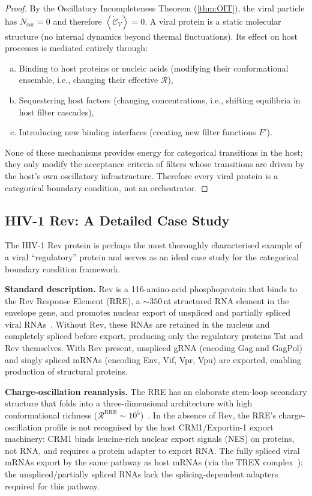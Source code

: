 \documentclass[11pt,twocolumn,a4paper]{article}
\theoremstyle{definition}
\theoremstyle{remark}
\newcommand{\Nosc}{N_{\mathrm{osc}}}
\newcommand{\Rcat}{\mathcal{R}}
\newcommand{\avg}[1]{\left\langle #1 \right\rangle}
\begin{document}
\begin{proof}
By the Oscillatory Incompleteness Theorem (\cref{thm:OIT}), the viral particle has $\Nosc = 0$ and therefore $\avg{\dot{\mathcal{C}}_V} = 0$. A viral protein is a static molecular structure (no internal dynamics beyond thermal fluctuations). Its effect on host processes is mediated entirely through:
\begin{enumerate}[(a)]
  \item Binding to host proteins or nucleic acids (modifying their conformational ensemble, i.e., changing their effective $\Rcat$),
  \item Sequestering host factors (changing concentrations, i.e., shifting equilibria in host filter cascades),
  \item Introducing new binding interfaces (creating new filter functions $F'$).
\end{enumerate}
None of these mechanisms provides energy for categorical transitions in the host; they only modify the acceptance criteria of filters whose transitions are driven by the host's own oscillatory infrastructure. Therefore every viral protein is a categorical boundary condition, not an orchestrator.
\end{proof}

\subsection{HIV-1 Rev: A Detailed Case Study}

The HIV-1 Rev protein is perhaps the most thoroughly characterised example of a viral ``regulatory'' protein and serves as an ideal case study for the categorical boundary condition framework.

\textbf{Standard description.} Rev is a 116-amino-acid phosphoprotein that binds to the Rev Response Element (RRE), a $\sim\!350$\,nt structured RNA element in the envelope gene, and promotes nuclear export of unspliced and partially spliced viral RNAs~\cite{Malim1989,Cullen1998}. Without Rev, these RNAs are retained in the nucleus and completely spliced before export, producing only the regulatory proteins Tat and Rev themselves. With Rev present, unspliced gRNA (encoding Gag and GagPol) and singly spliced mRNAs (encoding Env, Vif, Vpr, Vpu) are exported, enabling production of structural proteins.

\textbf{Charge-oscillation reanalysis.} The RRE has an elaborate stem-loop secondary structure that folds into a three-dimensional architecture with high conformational richness ($\Rcat^{\mathrm{RRE}} \sim 10^5$)~\cite{Bai2014}. In the absence of Rev, the RRE's charge-oscillation profile is not recognised by the host CRM1/Exportin-1 export machinery: CRM1 binds leucine-rich nuclear export signals (NES) on proteins, not RNA, and requires a protein adapter to export RNA. The fully spliced viral mRNAs export by the same pathway as host mRNAs (via the TREX complex~\cite{Strasser2002}); the unspliced/partially spliced RNAs lack the splicing-dependent adapters required for this pathway.
\end{document}
